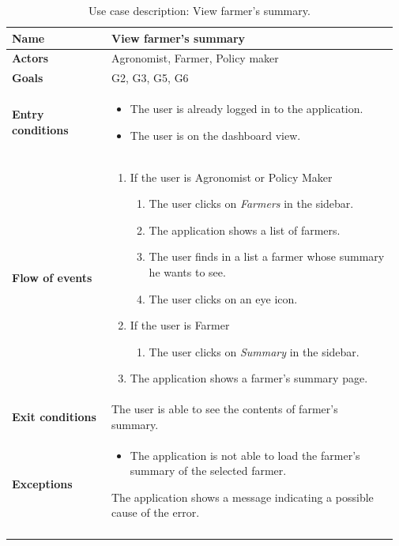 \begin{longtable}{@{}p{0.25\linewidth} p{0.72\linewidth}@{}}
    \toprule
	\textbf{Name}               & View farmer's summary\\
	\midrule
	\endfirsthead
	\textbf{Actors}             & Agronomist, Farmer, Policy maker\\
	\midrule
	\textbf{Goals}              & G2, G3, G5, G6 \\
	\midrule
	
	\textbf{Entry conditions}   & \begin{itemize}[leftmargin=.4cm,noitemsep,topsep=0pt,before=\vspace{-3mm},after=\vspace{-4mm}]
	    \item The user is already logged in to the application.
	    \item The user is on the dashboard view.
	\end{itemize}\\
	\midrule
	
	\textbf{Flow of events}     & \begin{enumerate}[leftmargin=.4cm,noitemsep,topsep=0pt,before=\vspace{-3mm},after=\vspace{-4mm}]
	    \item If the user is Agronomist or Policy Maker
	    \begin{enumerate}[noitemsep]
	        \item The user clicks on \textit{Farmers} in the sidebar.
	        \item The application shows a list of farmers.
	        \item The user finds in a list a farmer whose summary he wants to see.
	        \item The user clicks on an eye icon.
	    \end{enumerate}
	    \item If the user is Farmer
	    \begin{enumerate}[noitemsep]
	        \item The user clicks on \textit{Summary} in the sidebar.
	    \end{enumerate}
	    \item The application shows a farmer's summary page.
	\end{enumerate}\\
	\midrule
	\textbf{Exit conditions}    & The user is able to see the contents of farmer's summary. \\
	\midrule
	
	\textbf{Exceptions}         & 
    \begin{itemize}[leftmargin=.4cm,noitemsep,topsep=0pt,before=\vspace{-3mm}]
	   \item The application is not able to load the farmer's summary of the selected farmer.
	\end{itemize}
	The application shows a message indicating a possible cause of the error.
	\\\bottomrule
	\caption{Use case description: View farmer's summary.} 
\end{longtable}

